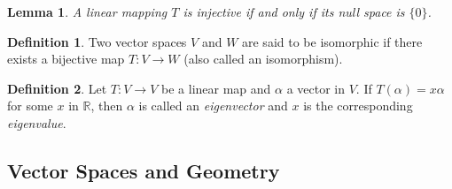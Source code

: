 \documentclass[12pt]{article}
\newcommand{\RR}{\mathbb{R}}
\newtheorem{lemma}[theorem]{Lemma}
\theoremstyle{definition}
\newtheorem{definition}{Definition}[section]
\begin{document}
	\begin{lemma}
		A linear mapping $T$ is injective if and only if its null space is $\{0\}$.
	\end{lemma}
	\begin{definition}
		Two vector spaces $V$ and $W$ are said to be isomorphic if there exists a bijective map $T: V \to W$ (also called an isomorphism).
	\end{definition}
	\begin{definition}
		Let $T: V \to V$ be a linear map and $\alpha$ a vector in $V$. If $T(\alpha) = x\alpha$ for some $x$ in $\RR$, then $\alpha$ is called an \textit{eigenvector} and $x$ is the corresponding \textit{eigenvalue}.
	\end{definition}
	\subsection{Vector Spaces and Geometry}
\end{document}
